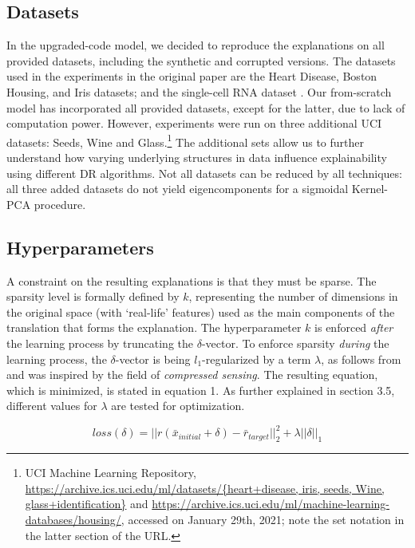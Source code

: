 \subsection{Datasets}
In the upgraded-code model, we decided to reproduce the explanations on all provided datasets, including the synthetic and corrupted versions. The datasets used in the experiments in the original paper are the Heart Disease, Boston Housing, and Iris datasets; and the single-cell RNA dataset \cite{shekhar2016comprehensive}. Our from-scratch model has incorporated all provided datasets, except for the latter, due to lack of computation power. However, experiments were run on three additional UCI datasets: Seeds, Wine and Glass.\footnote{UCI Machine Learning Repository, \url{https://archive.ics.uci.edu/ml/datasets/{heart+disease, iris, seeds, Wine, glass+identification}} and \url{https://archive.ics.uci.edu/ml/machine-learning-databases/housing/}, accessed on January 29th, 2021; note the set notation in the latter section of the URL.} The additional sets allow us to further understand how varying underlying structures in data influence explainability using different DR algorithms. Not all datasets can be reduced by all techniques: all three added datasets do not yield eigencomponents for a sigmoidal Kernel-PCA procedure.

\subsection{Hyperparameters}
A constraint on the resulting explanations is that they must be sparse. The sparsity level is formally defined by $k$, representing the number of dimensions in the original space (with `real-life' features) used as the main components of the translation that forms the explanation. The hyperparameter $k$ is enforced \textit{after} the learning process by truncating the $\delta$-vector. To enforce sparsity \textit{during} the learning process, the $\delta$-vector is being $l_1$-regularized by a term $\lambda$, as follows from \cite[p.~5]{plumb2020explaining} and was inspired by the field of \textit{compressed sensing}. The resulting equation, which is minimized, is stated in equation 1. As further explained in section 3.5, different values for $\lambda$ are tested for optimization.

\begin{equation}
loss(\delta) = ||r(\bar{x}_{initial} + \delta) - \bar{r}_{target}||^2_2 + \lambda||\delta||_1
\end{equation}

